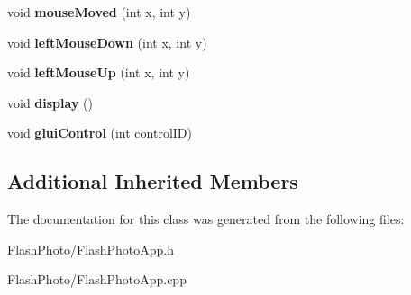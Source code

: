 \begin{DoxyCompactItemize}
\item 
\hypertarget{classFlashPhotoApp_acf5a4cc5b76bb676d337758543bfdcc4}{void {\bfseries mouse\-Moved} (int x, int y)}\label{classFlashPhotoApp_acf5a4cc5b76bb676d337758543bfdcc4}

\item 
\hypertarget{classFlashPhotoApp_a2c348ddcc15b6a21972bc6aac98c5442}{void {\bfseries left\-Mouse\-Down} (int x, int y)}\label{classFlashPhotoApp_a2c348ddcc15b6a21972bc6aac98c5442}

\item 
\hypertarget{classFlashPhotoApp_ae3a2f37b7c3657dcb5c16402c6d25519}{void {\bfseries left\-Mouse\-Up} (int x, int y)}\label{classFlashPhotoApp_ae3a2f37b7c3657dcb5c16402c6d25519}

\item 
\hypertarget{classFlashPhotoApp_a5dedc84bbc9ea0cf0718b8d0d0f414a5}{void {\bfseries display} ()}\label{classFlashPhotoApp_a5dedc84bbc9ea0cf0718b8d0d0f414a5}

\item 
\hypertarget{classFlashPhotoApp_aaeea3b8490d0f0239e41b781f6a066aa}{void {\bfseries glui\-Control} (int control\-I\-D)}\label{classFlashPhotoApp_aaeea3b8490d0f0239e41b781f6a066aa}

\end{DoxyCompactItemize}
\subsection*{Additional Inherited Members}


The documentation for this class was generated from the following files\-:\begin{DoxyCompactItemize}
\item 
Flash\-Photo/Flash\-Photo\-App.\-h\item 
Flash\-Photo/Flash\-Photo\-App.\-cpp\end{DoxyCompactItemize}
